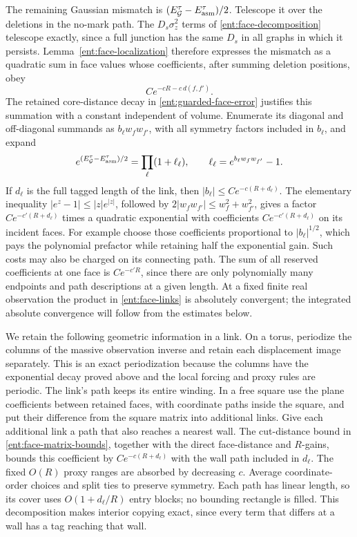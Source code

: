 The remaining Gaussian mismatch is
\((E_{\mathcal G}^\tau-E_{\rm asm}^\tau)/2\).
Telescope it over the deletions in the no-mark path.
The \(D_s\sigma_z^2\) terms of \eqref{ent:face-decomposition}
telescope exactly, since a full junction has the same \(D_s\)
in all graphs in which it persists.  Lemma~\ref{ent:face-localization}
therefore expresses the mismatch as a quadratic sum in face
values whose coefficients, after summing deletion positions, obey
\[
                         C e^{-cR-c\,d(f,f')}.
\]
The retained core-distance decay in
\eqref{ent:guarded-face-error} justifies this summation with a
constant independent of volume.  Enumerate its diagonal and
off-diagonal summands as \(b_\ell w_fw_{f'}\), with all symmetry
factors included in \(b_\ell\), and expand
\begin{equation}\label{ent:face-links}
 e^{(E_{\mathcal G}^\tau-E_{\rm asm}^\tau)/2}
       =\prod_\ell(1+\ell_\ell),
       \qquad \ell_\ell=e^{b_\ell w_fw_{f'}}-1.
\end{equation}
If \(d_\ell\) is the full tagged length of the link, then
\(|b_\ell|\le Ce^{-c(R+d_\ell)}\).  The elementary inequality
\(|e^z-1|\le |z|e^{|z|}\), followed by
\(2|w_fw_{f'}|\le w_f^2+w_{f'}^2\), gives a factor
\(Ce^{-c'(R+d_\ell)}\) times a quadratic exponential with
coefficients \(Ce^{-c'(R+d_\ell)}\) on its incident faces.
For example choose those coefficients proportional to
\(|b_\ell|^{1/2}\), which pays the polynomial prefactor while
retaining half the exponential gain.  Such costs may also be
charged on its connecting path.  The sum of all reserved
coefficients at one face is \(Ce^{-c'R}\), since there are only
polynomially many endpoints and path descriptions at a given
length.  At a fixed finite real observation the product in
\eqref{ent:face-links} is absolutely convergent; the integrated
absolute convergence will follow from the estimates below.

We retain the following geometric information in a link.  On a
torus, periodize the columns of the massive observation inverse
and retain each displacement image separately.  This is an exact
periodization because the columns have the exponential decay
proved above and the local forcing and proxy rules are periodic.
The link's path keeps its entire winding.  In a free square use
the plane coefficients between retained faces, with coordinate
paths inside the square, and put their difference from the square
matrix into additional links.  Give each additional link a path
that also reaches a nearest wall.  The cut-distance bound in
\eqref{ent:face-matrix-bounds}, together with the direct
face-distance and \(R\)-gains, bounds this coefficient by
\(Ce^{-c(R+d_\ell)}\) with the wall path included in \(d_\ell\).
The fixed \(O(R)\) proxy ranges are absorbed by decreasing \(c\).
Average coordinate-order choices and split ties to preserve
symmetry.  Each path has linear length, so its cover uses
\(O(1+d_\ell/R)\) entry blocks; no bounding rectangle is filled.
This decomposition makes interior copying exact, since every
term that differs at a wall has a tag reaching that wall.

